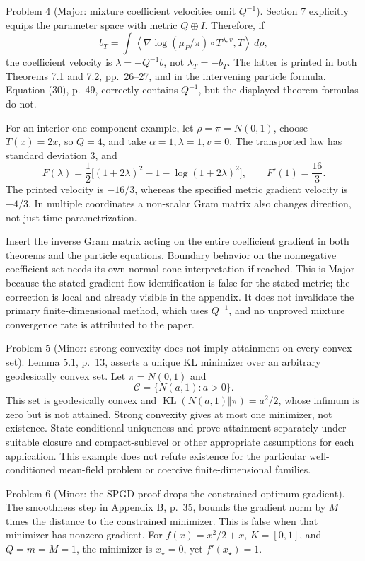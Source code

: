 \documentclass[10pt]{article}
\begin{document}
Problem 4 (Major: mixture coefficient velocities omit \(Q^{-1}\)).  Section 7 explicitly equips the parameter space with metric \(Q\oplus I\). Therefore, if \[b_T=\int\left\langle
 \nabla\log(\mu_P/\pi)\circ T^{\lambda,v},T
 \right\rangle\,d\rho,\] the coefficient velocity is \(\dot\lambda=-Q^{-1}b\), not \(\dot\lambda_T=-b_T\). The latter is printed in both Theorems 7.1 and 7.2, pp. 26–27, and in the intervening particle formula. Equation (30), p. 49, correctly contains \(Q^{-1}\), but the displayed theorem formulas do not.\par
For an interior one-component example, let \(\rho=\pi=N(0,1)\), choose \(T(x)=2x\), so \(Q=4\), and take \(\alpha=1,\lambda=1,v=0\). The transported law has standard deviation \(3\), and \[F(\lambda)=\frac12\bigl[(1+2\lambda)^2-1-\log(1+2\lambda)^2\bigr],
 \qquad F'(1)=\frac{16}{3}.\] The printed velocity is \(-16/3\), whereas the specified metric gradient velocity is \(-4/3\). In multiple coordinates a non-scalar Gram matrix also changes direction, not just time parametrization.\par
Insert the inverse Gram matrix acting on the entire coefficient gradient in both theorems and the particle equations. Boundary behavior on the nonnegative coefficient set needs its own normal-cone interpretation if reached. This is Major because the stated gradient-flow identification is false for the stated metric; the correction is local and already visible in the appendix. It does not invalidate the primary finite-dimensional method, which uses \(Q^{-1}\), and no unproved mixture convergence rate is attributed to the paper.\par
Problem 5 (Minor: strong convexity does not imply attainment on every convex set).  Lemma 5.1, p. 13, asserts a unique KL minimizer over an arbitrary geodesically convex set. Let \(\pi=N(0,1)\) and \[\mathcal C=\{N(a,1):a>0\}.\] This set is geodesically convex and \(\mathop{\mathrm{KL}}(N(a,1)\Vert\pi)=a^2/2\), whose infimum is zero but is not attained. Strong convexity gives at most one minimizer, not existence. State conditional uniqueness and prove attainment separately under suitable closure and compact-sublevel or other appropriate assumptions for each application. This example does not refute existence for the particular well-conditioned mean-field problem or coercive finite-dimensional families.\par
Problem 6 (Minor: the SPGD proof drops the constrained optimum gradient).  The smoothness step in Appendix B, p. 35, bounds the gradient norm by \(M\) times the distance to the constrained minimizer. This is false when that minimizer has nonzero gradient. For \(f(x)=x^2/2+x\), \(K=[0,1]\), and \(Q=m=M=1\), the minimizer is \(x_\star=0\), yet \(f'(x_\star)=1\).\par
\end{document}
